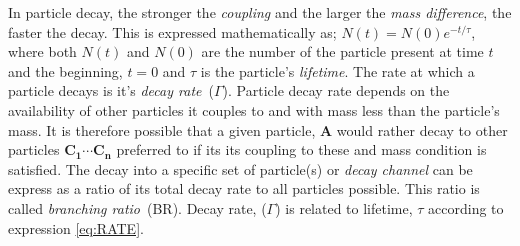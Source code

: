 {%
In particle decay, the stronger the \textit{coupling} and the larger the \textit{mass difference}, the faster the decay. This is 
expressed mathematically as; $N(t) = N(0)e^{-t/\tau}$, where both $N(t)$ and $N(0)$ are the number of the particle present
at time $t$ and the beginning, $t=0$ and $\tau$ is the particle's \textit{lifetime}.
\newline
The rate at which a particle decays is it's \textit{decay rate}~(\textbf{$\Gamma$}).
Particle decay rate depends on the availability of other particles it couples to and with
mass less than the particle's mass. It is therefore possible that a given particle, $\mathbf{A}$
would rather decay to other particles  $\mathbf{C_{1}}\cdots \mathbf{C_{n}}$ preferred to
if its its coupling to these and mass condition is satisfied.
The decay into a specific set of particle(s) or \textit{decay channel} can be express as a ratio
of its total decay rate to all particles possible.
This ratio is called \textit{ branching ratio}~(BR). Decay rate, (\textbf{$\Gamma$}) is related to lifetime, $\tau$
according to expression \ref{eq:RATE}.

}
